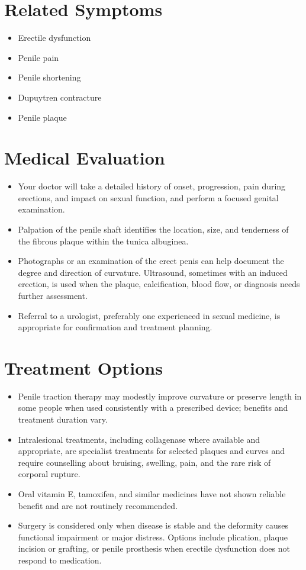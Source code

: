 \section*{Related Symptoms}
\begin{itemize}
 \item Erectile dysfunction
 \item Penile pain
 \item Penile shortening
 \item Dupuytren contracture
 \item Penile plaque
\end{itemize}


\section*{Medical Evaluation}
\begin{itemize}
 \item Your doctor will take a detailed history of onset, progression, pain during erections, and impact on sexual function, and perform a focused genital examination.
 \item Palpation of the penile shaft identifies the location, size, and tenderness of the fibrous plaque within the tunica albuginea.
 \item Photographs or an examination of the erect penis can help document the degree and direction of curvature. Ultrasound, sometimes with an induced erection, is used when the plaque, calcification, blood flow, or diagnosis needs further assessment.
 \item Referral to a urologist, preferably one experienced in sexual medicine, is appropriate for confirmation and treatment planning.
\end{itemize}

\section*{Treatment Options}
\begin{itemize}
 \item Penile traction therapy may modestly improve curvature or preserve length in some people when used consistently with a prescribed device; benefits and treatment duration vary.
 \item Intralesional treatments, including collagenase where available and appropriate, are specialist treatments for selected plaques and curves and require counselling about bruising, swelling, pain, and the rare risk of corporal rupture.
 \item Oral vitamin E, tamoxifen, and similar medicines have not shown reliable benefit and are not routinely recommended.
 \item Surgery is considered only when disease is stable and the deformity causes functional impairment or major distress. Options include plication, plaque incision or grafting, or penile prosthesis when erectile dysfunction does not respond to medication.
\end{itemize}


